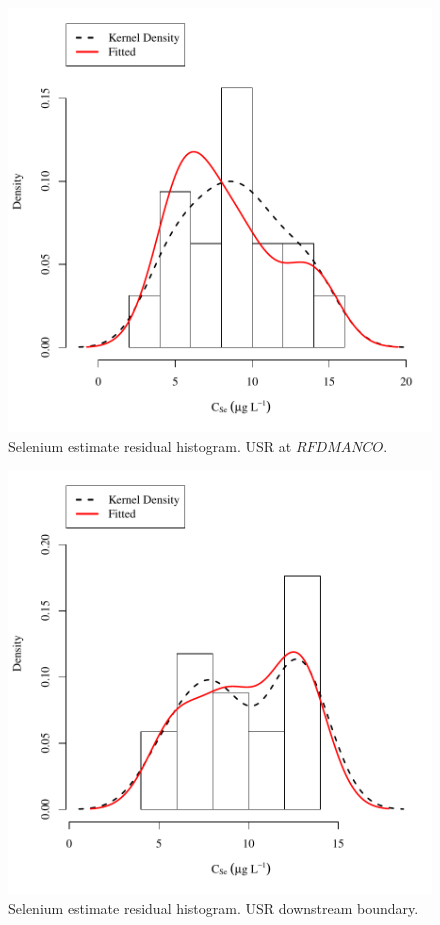 \begin{figure}[htbp]
	\begin{center}
	\includegraphics[width=6in]{"Figures/Results_USR/Conc Model ResDist U167"}
	\caption{Selenium estimate residual histogram.  USR at $RFDMANCO$.}
	\end{center}
\end{figure}
\newpage

\begin{figure}[htbp]
	\begin{center}
	\includegraphics[width=6in]{"Figures/Results_USR/Conc Model ResDist U201"}
	\caption{Selenium estimate residual histogram.  USR downstream boundary.}
	\end{center}
\end{figure}
\newpage

